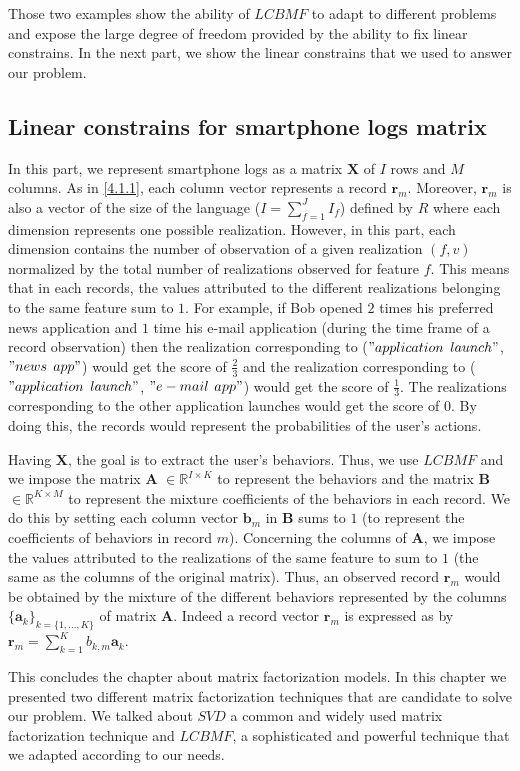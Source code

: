 Those two examples show the ability of $LCBMF$ to adapt to different problems and expose the large degree of freedom provided by the ability to fix linear constrains. In the next part, we show the linear constrains that we used to answer our problem.

\subsection{Linear constrains for smartphone logs matrix} \label{4.2}

In this part, we represent smartphone logs as a matrix $\boldsymbol{X}$ of $I$ rows and $M$ columns. As in \ref{4.1.1}, each column vector represents a record $\mathbf{r}_{m}$. Moreover, $\mathbf{r}_{m}$ is also a vector of the size of the language ($I=\sum_{f=1}^{J}I_{f}$) defined by $R$ where each dimension represents one possible realization. However, in this part, each dimension contains the number of observation of a given realization $(f,v)$ normalized by the total number of realizations observed for feature $f$. This means that in each records, the values attributed to the different realizations belonging to the same feature sum to $1$. For example, if Bob opened $2$ times his preferred news application and $1$ time his e-mail application (during the time frame of a record observation) then the realization corresponding to ($"application$ $launch"$, $"news$ $app"$) would get the score of $\frac{2}{3}$ and the realization corresponding to ($"application$ $launch"$, $"e-mail$ $app"$) would get the score of $\frac{1}{3}$. The realizations corresponding to the other application launches would get the score of $0$. By doing this, the records would represent the probabilities of the user's actions. \par

Having $\boldsymbol{X}$, the goal is to extract the user's behaviors. Thus, we use $LCBMF$ and we impose the matrix $\boldsymbol{A}$ $\in\mathbb{R}^{I\times K}$ to represent the behaviors and the matrix $\boldsymbol{B}$ $\in\mathbb{R}^{K\times M}$ to represent the mixture coefficients of the behaviors in each record. We do this by setting each column vector $\mathbf{b}_{m}$ in $\boldsymbol{B}$ sums to $1$ (to represent the coefficients of behaviors in record $m$). Concerning the columns of $\boldsymbol{A}$, we impose the values attributed to the realizations of the same feature to sum to $1$ (the same as the columns of the original matrix). Thus, an observed record $\mathbf{r}_{m}$ would be obtained by the mixture of the different behaviors represented by the columns $\{\mathbf{a}_{k}\}_{k=\{1,...,K\}}$ of matrix $\boldsymbol{A}$. Indeed a record vector $\mathbf{r}_m$ is expressed as by $\mathbf{r}_m = \sum_{k=1}^{K}b_{k,m}\mathbf{a}_{k}$. \par

This concludes the chapter about matrix factorization models. In this chapter we presented two different matrix factorization techniques that are candidate to solve our problem. We talked about $SVD$ a common and widely used matrix factorization technique and $LCBMF$, a sophisticated and powerful technique that we adapted according to our needs.